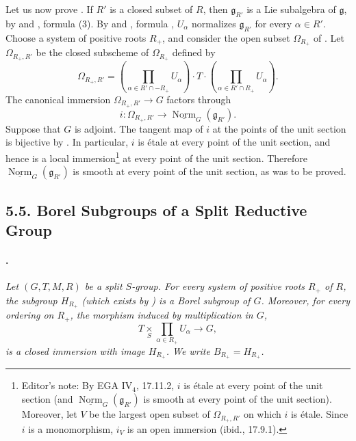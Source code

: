 Let us now prove . If \(R'\) is a closed subset of \(R\), then
\(\mathfrak g_{R'}\) is a Lie subalgebra of \(\mathfrak g\), by
 and , formula \textup{(3)}. By  and
, formula \textup{}, \(U_\alpha\) normalizes
\(\mathfrak g_{R'}\) for every \(\alpha\in R'\). Choose a system of
positive roots \(R_+\), and consider the open subset
\(\Omega_{R_+}\) of . Let \(\Omega_{R_+,R'}\) be the closed
subscheme of \(\Omega_{R_+}\) defined by
\[
  \Omega_{R_+,R'}
  =
  \left(
    \prod_{\alpha\in R'\cap -R_+}U_\alpha
  \right)
  \cdot T\cdot
  \left(
    \prod_{\alpha\in R'\cap R_+}U_\alpha
  \right).
\]
The canonical immersion \(\Omega_{R_+,R'}\to G\) factors through
\[
  i:\Omega_{R_+,R'}
  \longrightarrow
  \underline{\operatorname{Norm}}_G(\mathfrak g_{R'}).
\]
Suppose that \(G\) is adjoint. The tangent map of \(i\) at the
points of the unit section is bijective by . In particular,
\(i\) is étale at every point of the unit section, and hence is a
local immersion\footnote{Editor's note: By EGA
\(\mathrm{IV}_4\), 17.11.2, \(i\) is étale at every point of the
unit section \textup{(and
\(\underline{\operatorname{Norm}}_G(\mathfrak g_{R'})\) is smooth
at every point of the unit section)}. Moreover, let \(V\) be the
largest open subset of \(\Omega_{R_+,R'}\) on which \(i\) is
étale. Since \(i\) is a monomorphism, \(i_V\) is an open immersion
\textup{(ibid., 17.9.1)}.} at every point of the unit section.
Therefore
\(\underline{\operatorname{Norm}}_G(\mathfrak g_{R'})\) is smooth
at every point of the unit section, as was to be proved.

\subsection*{5.5. Borel Subgroups of a Split Reductive Group}

\paragraph{.}
\textit{Let \((G,T,M,R)\) be a split \(S\)-group. For every system
of positive roots \(R_+\) of \(R\), the subgroup \(H_{R_+}\)
\textup{(which exists by )} is a Borel subgroup of \(G\).
Moreover, for every ordering on \(R_+\), the morphism induced by
multiplication in \(G\),}
\[
  T\mathop{\times}\limits_S
  \prod_{\alpha\in R_+}U_\alpha
  \longrightarrow G,
\]
\textit{is a closed immersion with image \(H_{R_+}\). We write
\(B_{R_+}=H_{R_+}\).}

